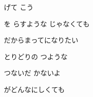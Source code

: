 \documentclass[a4paper,tate,twocolumn,12pt]{ltjtarticle}
\begin{document}
\begin{flushleft}
\begin{minipage}{\linewidth}
げて こう

を らすような じゃなくても

だからまってになりたい

とりどりの つような

つないだ かないよ

がどんなにしくても
\end{minipage}

\end{flushleft}
\end{document}
